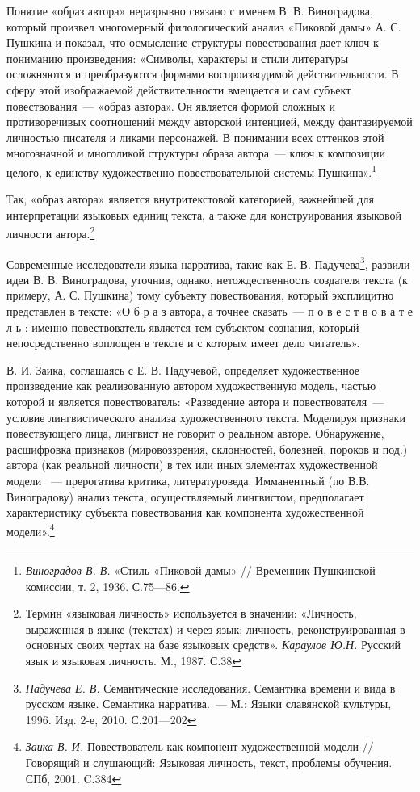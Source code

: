 \documentclass{kursa4}
\begin{document}
{      Понятие «образ автора» неразрывно связано с именем В. В. Виноградова, который произвел многомерный филологический анализ «Пиковой дамы» А. С. Пушкина и показал, что осмысление структуры повествования дает ключ к пониманию произведения: «Символы, характеры и стили литературы осложняются и преобразуются формами воспроизводимой действительности. В сферу этой изображаемой действительности вмещается и сам субъект повествования~--- «образ автора». Он является формой сложных и противоречивых соотношений между авторской интенцией, между фантазируемой личностью писателя и ликами персонажей. В понимании всех оттенков этой многозначной и многоликой структуры образа автора~--- ключ к композиции целого, к единству художественно-повествовательной системы Пушкина».\footnote{\textit{{Виноградов В. В. }}{«Стиль «Пиковой дамы» // Временник Пушкинской комиссии, т. 2, 1936. С.75—86.}} 

      Так, «образ автора» является внутритекстовой категорией, важнейшей для интерпретации языковых единиц текста, а также для конструирования языковой личности автора.\footnote{{Термин «языковая личность» используется в значении: «Личность, выраженная в языке (текстах) и через язык; личность, реконструированная в основных своих чертах на базе языковых средств». }\textit{{Караулов Ю.Н. }}{Русский язык и языковая личность. М., 1987. С.38}} 

      Современные исследователи языка нарратива, такие как Е. В. Падучева\footnote{\textit{{Падучева Е. В. }}{Семантические исследования. Семантика времени и вида в русском языке. Семантика нарратива.~--- М.: Языки славянской культуры, 1996. Изд. 2-е, 2010. С.201—202}}, развили идеи В. В. Виноградова, уточнив, однако, нетождественность создателя текста (к примеру, А. С. Пушкина) тому субъекту повествования, который эксплицитно представлен в тексте:\newline
      «О б р а з автора, а точнее сказать~--- п о в е с т в о в а т е л ь : именно повествователь является тем субъектом сознания, который непосредственно воплощен в тексте и с которым имеет дело читатель». 

      В. И. Заика, соглашаясь с Е. В. Падучевой, определяет художественное произведение как реализованную автором художественную модель, частью которой и является повествователь: «Разведение автора и повествователя~--- условие лингвистического анализа художественного текста. Моделируя признаки повествующего лица, лингвист не говорит о реальном авторе. Обнаружение, расшифровка признаков (мировоззрения, склонностей, болезней, пороков и под.) автора (как реальной личности) в тех или иных элементах художественной модели ~--- прерогатива критика, литературоведа. Имманентный (по В.В. Виноградову) анализ текста, осуществляемый лингвистом, предполагает характеристику субъекта повествования как компонента художественной модели».\footnote{\textit{{Заика В. И. }}{Повествователь как компонент художественной модели //Говорящий и слушающий: Языковая личность, текст, проблемы обучения. СПб, 2001. C.384}}

}
\end{document}
